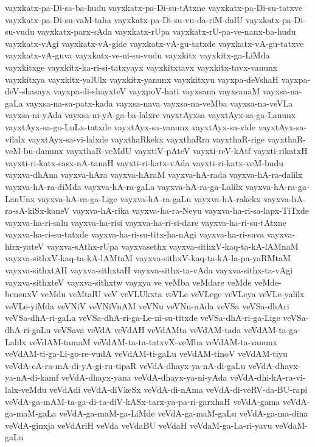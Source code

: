 {vayxkatx-pa-Di-sa-ba-hudu
vayxkatx-pa-Di-su-tAtxne
vayxkatx-pa-Di-su-tatxve
vayxkatx-pa-Di-su-vaM-taha
vayxkatx-pa-Di-su-vu-da-riM-dalU
vayxkatx-pa-Di-su-vudu
vayxkatx-parx-sAda
vayxkatx-rUpa
vayxkatx-rU-pa-ve-nanx-ba-hudu
vayxkatx-vAgi
vayxkatx-vA-gide
vayxkatx-vA-gu-tatxde
vayxkatx-vA-gu-tatxve
vayxkatx-vA-guva
vayxkatx-ve-ni-su-vudu
vayxkitx
vayxkitx-ga-LiMda
vayxkitxge
vayxkitx-ka-ri-si-tatxyayx
vayxkitxtavx
vayxkitx-tavx-vanunx
vayxkitxya
vayxkitx-yalUlx
vayxkitx-yanunx
vayxkitxyu
vayxpa-deVshaH
vayxpa-deV-shasayx
vayxpa-di-shayxteV
vayxpoV-hati
vayxsana
vayxsanaM
vayxsa-na-gaLa
vayxsa-na-sa-patx-kada
vayxsa-nava
vayxsa-na-veMba
vayxsa-na-veVLa
vayxsa-ni-yAda
vayxsa-ni-yA-ga-ba-lalxre
vayxtAyxsa
vayxtAyx-sa-ga-Lanunx
vayxtAyx-sa-go-LuLx-tatxde
vayxtAyx-sa-vanunx
vayxtAyx-sa-vide
vayxtAyx-sa-vilalx
vayxtAyx-sa-vi-lalxde
vayxthaRkekx
vayxthaRra
vayxthaR-rige
vayxthaR-veM-bu-danunx
vayxthaR-veMdU
vayxtiV-pAteV
vayxti-reV-kAtf
vayxti-rikatxH
vayxti-ri-katx-sasx-nA-tanaH
vayxti-ri-katx-vAda
vayxti-ri-katx-veM-budu
vayxva-dhAna
vayxva-hAra
vayxva-hAraM
vayxva-hA-rada
vayxva-hA-ra-dalilx
vayxva-hA-ra-diMda
vayxva-hA-ra-gaLa
vayxva-hA-ra-ga-Lalilx
vayxva-hA-ra-ga-LanUnx
vayxva-hA-ra-ga-Lige
vayxva-hA-ra-gaLu
vayxva-hA-rakekx
vayxva-hA-ra-sA-kiSx-kaneV
vayxva-hA-rika
vayxva-ha-ra-Neyu
vayxva-ha-ri-sa-lapx-TiTxde
vayxva-ha-ri-salu
vayxva-ha-risi
vayxva-ha-ri-si-dare
vayxva-ha-ri-su-tAtxne
vayxva-ha-ri-su-tatxde
vayxva-ha-ri-su-titx-ha-nAgi
vayxva-ha-ri-suva
vayxva-hirx-yateV
vayxva-sAthx-rUpa
vayxvasethx
vayxva-sithxV-kaq-ta-kA-lAMnaM
vayxva-sithxV-kaq-ta-kA-lAMtaM
vayxva-sithxV-kaq-ta-kA-la-pa-yaRMtaM
vayxva-sithxtAH
vayxva-sithxtaH
vayxva-sithx-ta-vAda
vayxva-sithx-ta-vAgi
vayxva-sithxteV
vayxva-sithxtw
vayxya
ve
veMba
veMdare
veMde
veMde-benenxV
veMdu
veMtalU
veV
veVLUkxta
veVLe
veVLege
veVLeya
veVLe-yalilx
veVLe-yiMda
veVNiV
veVNiVnAM
veVNu
veVNu-nAda
veVSa
veVSa-dhAri
veVSa-dhA-ri-gaLa
veVSa-dhA-ri-ga-Le-ni-su-titxde
veVSa-dhA-ri-ga-Lige
veVSa-dhA-ri-gaLu
veVSava
veVdA
veVdAH
veVdAMta
veVdAM-tada
veVdAM-ta-ga-Lalilx
veVdAM-tamaM
veVdAM-ta-ta-tatxvX-veMba
veVdAM-ta-vanunx
veVdAM-ti-ga-Li-go-re-vudA
veVdAM-ti-gaLu
veVdAM-tinoV
veVdAM-tiyu
veVdA-cA-ra-mA-di-yA-gi-ru-tipaR
veVdA-dhayx-ya-nA-di-gaLu
veVdA-dhayx-ya-nA-di-kamf
veVdA-dhayx-yana
veVdA-dhayx-ya-ni-yAda
veVdA-dhi-kA-ra-vi-lalx-veMdu
veVdAdi
veVdA-diVkeSx
veVdA-di-nAma
veVdA-di-veRV-da-BU-rapi
veVdA-ga-mAM-ta-ga-di-ta-diV-kASx-tarx-ya-pa-ri-garxhaH
veVdA-gama
veVdA-ga-maM-gaLa
veVdA-ga-maM-ga-LiMde
veVdA-ga-maM-gaLu
veVdA-ga-ma-dina
veVdA-ginxja
veVdAriH
veVda
veVdaBU
veVdaH
veVdaM-ga-La-ri-yavu
veVdaM-gaLu
}
